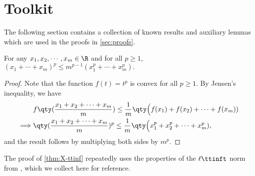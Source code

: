 \documentclass[10pt]{article}
\begin{document}





















\section{Toolkit}
\label{sec:toolkit}

The following section contains a collection of known results and auxiliary lemmas which are used in the proofs in \cref{sec:proofs}.


\begin{lemma}\label{lem:power-identities}
For any $x_1, x_2, \cdots, x_m \in \R$ and for all $p \ge 1$, $(x_1 + \cdots + x_m)^p \le m^{p-1} (x^p_1 + \cdots + x^p_m).$
\end{lemma}

\begin{proof}
Note that the function $f(t) = t^p$ is convex for all $p \ge 1$. By Jensen's inequality, we have
\begin{align}
    &f\qty(\frac{x_1 + x_2 + \cdots + x_m}{m}) \le \frac{1}{m}\qty\Big(f(x_1) + f(x_2) + \cdots + f(x_m))\\ 
    \implies
    &\qty(\frac{x_1 + x_2 + \cdots + x_m}{m})^p \le \frac{1}{m}\qty\Big(x_1^p + x_2^p + \cdots + x_m^p),
\end{align}
and the result follows by multiplying both sides by $m^p$.
\end{proof}





















The proof of \cref{thm:X-ttinf} repeatedly uses the properties of the $\ell\ttinft$ norm from \cite[Section~6.1]{cape2019two}, which we collect here for reference. 
\end{document}
